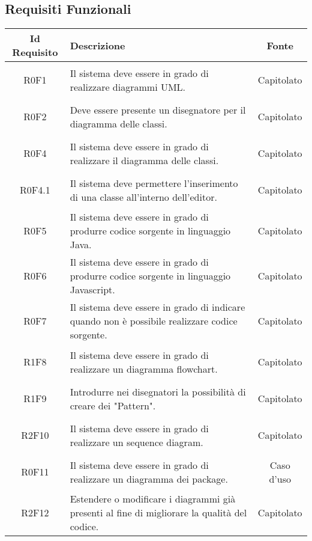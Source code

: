\documentclass[../AnalisiDeiRequisiti.tex]{subfiles}
\begin{document}
\newpage
\subsection{Requisiti Funzionali}
\normalsize
\begin{longtable}{|c|>{\centering}p{7cm}|c|}
	\hline
	\textbf{Id Requisito} & \textbf{Descrizione} & \textbf{Fonte}\\
	\hline
	\endhead
	\hypertarget{R0F1}{R0F1} & Il sistema deve essere in grado di realizzare diagrammi UML. & Capitolato \\ \hline
	\hypertarget{R0F2}{R0F2} & Deve essere presente un disegnatore per il diagramma delle classi. & Capitolato \\ \hline
	\hypertarget{R0F4}{R0F4} & Il sistema deve essere in grado di realizzare il diagramma delle classi. & Capitolato \\ \hline
	\hypertarget{R0F4.1}{R0F4.1} & Il sistema deve permettere l'inserimento di una classe all'interno dell'editor. & Capitolato \\ \hline
	\hypertarget{R0F5}{R0F5} & Il sistema deve essere in grado di produrre codice sorgente in linguaggio Java. & Capitolato \\ \hline
	\hypertarget{R0F6}{R0F6} & Il sistema deve essere in grado di produrre codice sorgente in linguaggio Javascript. & Capitolato \\ \hline
	\hypertarget{R0F7}{R0F7} & Il sistema deve essere in grado di indicare quando non è possibile realizzare codice sorgente. & Capitolato \\ \hline
	\hypertarget{R1F8}{R1F8} & Il sistema deve essere in grado di realizzare un diagramma flowchart. & Capitolato \\ \hline
	\hypertarget{R1F9}{R1F9} & Introdurre nei disegnatori la possibilità di creare dei "Pattern". & Capitolato \\ \hline
	\hypertarget{R2F10}{R2F10} & Il sistema deve essere in grado di realizzare un sequence diagram. & Capitolato \\ \hline
	\hypertarget{R0F11}{R0F11} & Il sistema deve essere in grado di realizzare un diagramma dei package. & Caso d'uso \\ \hline
	\hypertarget{R2F12}{R2F12} & Estendere o modificare i diagrammi già presenti al fine di migliorare la qualità del codice. & Capitolato \\ \hline

\end{longtable}
\end{document}
